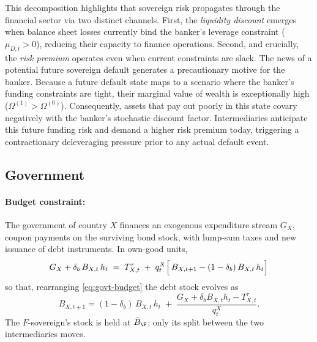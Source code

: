 This decomposition highlights that sovereign risk propagates through the financial sector via two distinct channels. First, the \emph{liquidity discount} emerges when balance sheet losses currently bind the banker's leverage constraint ($\mu_{D,t} > 0$), reducing their capacity to finance operations. Second, and crucially, the \emph{risk premium} operates even when current constraints are slack. The news of a potential future sovereign default generates a precautionary motive for the banker. Because a future default state maps to a scenario where the banker's funding constraints are tight, their marginal value of wealth is exceptionally high ($\Omega^{(1)} > \Omega^{(0)}$). Consequently, assets that pay out poorly in this state covary negatively with the banker's stochastic discount factor. Intermediaries anticipate this future funding risk and demand a higher risk premium today, triggering a contractionary deleveraging pressure prior to any actual default event.



\subsection{Government}

\paragraph{Budget constraint:} The government of country $X$ finances an exogenous expenditure stream $G_X$, coupon payments on the surviving bond stock, with lump-sum taxes and new issuance of debt instruments. In own-good units, 
\begin{equation}
\;
G_X+\delta_b\,B_{X,t}\,h_t
\;=\;T^{\tau}_{X,t}
\;+\;q^{X}_{t}\Bigl[\,B_{X,t+1}-(1-\delta_b)\,B_{X,t}\,h_t\Bigr]\;
\label{eq:govt-budget}
\end{equation}
so that, rearranging \eqref{eq:govt-budget}  the debt stock evolves as
\begin{equation}
B_{X,t+1}=(1-\delta_b)\,B_{X,t}\,h_t
\;+\;\frac{G_X+\delta_b B_{X,t}h_t-T^{\tau}_{X,t}}{q^{X}_{t}} .
\label{eq:debt-lom}
\end{equation}
The $F$-sovereign's stock is held at $\bar B_\F$; only its split between the two
intermediaries moves.

